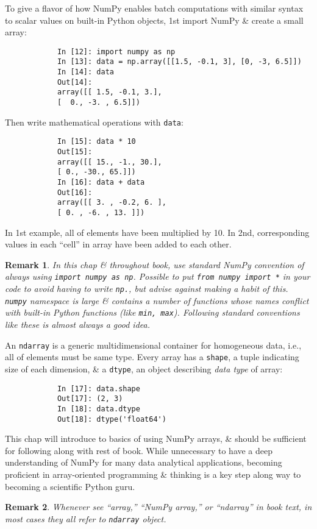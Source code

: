 \documentclass{article}
\newtheorem{remark}{Remark}
\begin{document}
\begin{itemize}
\begin{itemize}
		To give a flavor of how NumPy enables batch computations with similar syntax to scalar values on built-in Python objects, 1st import NumPy \& create a small array:
		\begin{verbatim}
			In [12]: import numpy as np
			In [13]: data = np.array([[1.5, -0.1, 3], [0, -3, 6.5]])
			In [14]: data
			Out[14]:
			array([[ 1.5, -0.1, 3.],
			[  0., -3. , 6.5]])
		\end{verbatim}
		Then write mathematical operations with {\tt data}:
		\begin{verbatim}
			In [15]: data * 10
			Out[15]:
			array([[ 15., -1., 30.],
			[ 0., -30., 65.]])
			In [16]: data + data
			Out[16]:
			array([[ 3. , -0.2, 6. ],
			[ 0. , -6. , 13. ]])
		\end{verbatim}
		In 1st example, all of elements have been multiplied by 10. In 2nd, corresponding values in each ``cell'' in array have been added to each other.
		\begin{remark}
			In this chap \& throughout book, use standard NumPy convention of always using {\tt import numpy as np}. Possible to put {\tt from numpy import *} in your code to avoid having to write {\tt np.}, but advise against making a habit of this. {\tt numpy} namespace is large \& contains a number of functions whose names conflict with built-in Python functions (like {\tt min, max}). Following standard conventions like these is almost always a good idea.
		\end{remark}
		An {\tt ndarray} is a generic multidimensional container for homogeneous data, i.e., all of elements must be same type. Every array has a {\tt shape}, a tuple indicating size of each dimension, \& a {\tt dtype}, an object describing {\it data type} of array:
		\begin{verbatim}
			In [17]: data.shape
			Out[17]: (2, 3)
			In [18]: data.dtype
			Out[18]: dtype('float64')
		\end{verbatim}
		This chap will introduce to basics of using NumPy arrays, \& should be sufficient for following along with rest of book. While unnecessary to have a deep understanding of NumPy for many data analytical applications, becoming proficient in array-oriented programming \& thinking is a key step along way to becoming a scientific Python guru.
		\begin{remark}
			Whenever see ``array,'' ``NumPy array,'' or ``ndarray'' in book text, in most cases they all refer to {\tt ndarray} object.
		\end{remark}
		

\end{itemize}
\end{itemize}
\end{document}
